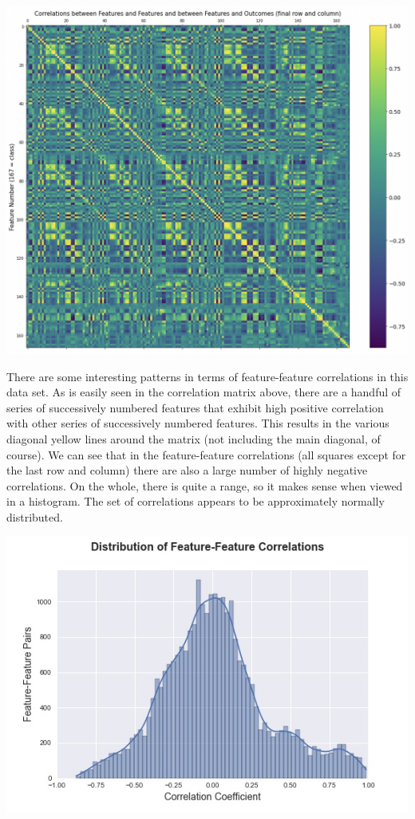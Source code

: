 \documentclass[12pt]{article}
\begin{document}
\begin{center}
\includegraphics[scale=0.5]{correlation_matrix.jpg}
\end{center}

There are some interesting patterns in terms of feature-feature correlations in this data set. As is easily seen in the correlation matrix above, there are a handful of series of successively numbered features that exhibit high positive correlation with other series of successively numbered features. This results in the various diagonal yellow lines around the matrix (not including the main diagonal, of course). We can see that in the feature-feature correlations (all squares except for the last row and column) there are also a large number of highly negative correlations. On the whole, there is quite a range, so it makes sense when viewed in a histogram. The set of correlations appears to be approximately normally distributed.

\begin{center}
\includegraphics[scale=0.5]{figures/feature_feature_corr.jpg}
\end{center}
\end{document}
